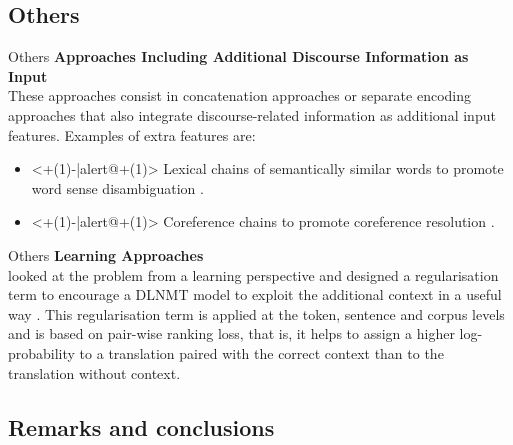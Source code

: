 \subsection{Others}

\begin{frame}{Others}
	\textbf{Approaches Including Additional Discourse Information as Input}\\
	These approaches consist in concatenation approaches or separate encoding approaches that also integrate discourse-related information as additional input features. Examples of extra features are:
	\begin{itemize}
		\item<+(1)-|alert@+(1)> Lexical chains of semantically similar words to promote word sense disambiguation \cite{rios_gonzales_improving_2017}.
		\item<+(1)-|alert@+(1)> Coreference chains to promote coreference resolution \cite{stojanovski_coreference_2018, ohtani_context-aware_2019}.
	\end{itemize}
\end{frame}

\begin{frame}{Others}
	\textbf{Learning Approaches}\\
	 \cite{jean_context-aware_2019} looked at the problem from a learning perspective and designed a regularisation term
to encourage a DLNMT model to exploit the additional context in a useful way . This regularisation
term is applied at the token, sentence and corpus levels and is based on pair-wise ranking loss,
that is, it helps to assign a higher log-probability to a translation paired with the correct context
than to the translation without context.
\end{frame}

\subsection{Remarks and conclusions}

